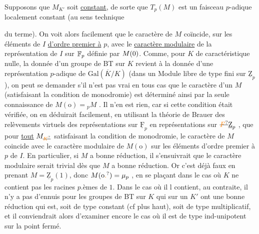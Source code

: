Supposons que $M_{K'}$ soit \uline{constant}, de sorte que  $T_p(M)$ est un faisceau $p$-adique localement constant (au sens technique

du terme). On voit alors facilement que le caractère de $M$ coïncide, sur les éléments de $I$ \uline{d'ordre premier à} $p$, avec le \uline{caractère modulaire} de la représentation de $I$  sur $\mathbb F_p$ définie par $M(0)$. Comme, pour $K$ de caractéristique nulle, la donnée d'un groupe de BT sur $K$ revient à la donnée d'une représentation $p$-adique de $\mathrm{Gal}(\overline K/K)$ (dans un Module libre de type fini sur $\underline{\mathrm Z}_p$), on peut se demander  s'il n'est pas vrai en tous cas que le caractère d'un $M$ (satisfaisant la condition de monodromie) est déterminé ainsi par la seule connaissance de $M(\mathrm o)={}_pM$ . Il n'en est rien, car si cette condition était vérifiée, on en déduirait facilement, en utilisant la théorie de Brauer des relèvements virtuels des représentations sur $\underline{\mathrm F}_p$ en représentations sur $\deleted{\unsure{F}}\underline{\mathrm Z}_p$ , que pour \uline{tout} $M_{\deleted{\unsure{K}}}$ satisfaisant la condition de monodromie, le caractère de $M$ coincide avec le caractère modulaire de $M(\mathrm o)$ sur les éléments d'ordre premier à $p$ de $I$. En particulier, si $M$ a bonne réduction, il s'ensuivrait que le caractère modulaire  serait trivial dès que $M$ a bonne réduction. Or c'est déjà faux en prenant $M=\underline{\mathrm Z}_p(1)$, donc $M(\mathrm o\unsure{.})=\handwritten{\mu}_p$ ,  en se plaçant dans le cas où $K$ ne contient pas les racines $p$.èmes de $1$. Dans le cas où il l contient, au contraite, il n'y a pas d'ennuis pour les groupes de BT sur $K$ qui sur un $K'$ ont une bonne réduction qui est, soit de type constant (cf plus haut), soit de type multiplicatif, et il conviendrait alors d'examiner encore le cas où il est de type ind-unipotent sur la  point fermé.



